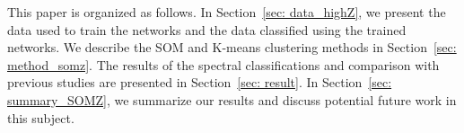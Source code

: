 

This paper is organized as follows.
In Section~\ref{sec: data_highZ}, we present the data used to train the networks and the data classified using the trained networks. 
We describe the SOM and K-means clustering methods in Section~\ref{sec: method_somz}. 
The results of the spectral classifications and comparison with previous studies are presented in Section~\ref{sec: result}. 
In Section~\ref{sec: summary_SOMZ}, we summarize our results and discuss potential future work in this subject.